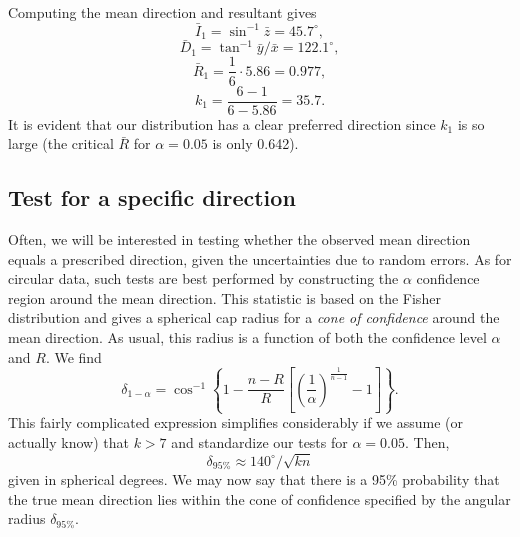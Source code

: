 \begin{example}
$$$$
Computing the mean direction and resultant gives
\begin{equation}
\bar{I}_1 = \sin ^{-1} \bar{z} = 45.7^{\circ},
\end{equation}
\begin{equation}
\bar{D}_1 = \tan^{-1} \bar{y} / \bar{x} = 122.1^{\circ},
\end{equation}
\begin{equation}
\bar{R}_1 = \frac{1}{6} \cdot 5.86 = 0.977,
\end{equation}
\begin{equation}
k_1 = \frac{6-1}{6-5.86} = 35.7.
\end{equation}	 
It is evident that our distribution has a clear preferred direction since $k_1$ is so large (the critical
$\bar{R}$ for $\alpha = 0.05$ is only 0.642).
\end{example}

\subsection{Test for a specific direction}

Often, we will be interested in testing whether the observed mean direction equals a 
prescribed direction, given the uncertainties due to random errors.  As for circular data, such tests
are best performed by constructing the $\alpha$ confidence region around the mean direction.  This
statistic is based on the Fisher distribution and gives a spherical cap radius for a \emph{cone of confidence}
around the mean direction.  As usual, this radius is a function of both the confidence level $\alpha$ and $R$.  
We find
\begin{equation}
\delta_{1- \alpha} = \cos^{-1} \left \{1- \frac{n-R}{R} \left[ \left (\frac{1}{ \alpha}\right )^{ \frac{1}{n-1}}-1 \right] \right \}.
\label{eq:exactconer}
\end{equation}
This fairly complicated expression simplifies considerably if we assume (or actually know) that $k > 7$ and
standardize our tests for $\alpha = 0.05$.  Then, 
\begin{equation}
\delta_{95\%} \approx 140^\circ /\sqrt{kn}
\label{eq:cone95}
\end{equation}
given in spherical degrees.  We may now say that there is a 95\% probability that the true mean direction lies within the cone of 
confidence specified by the angular radius $\delta_{95\%}$.

